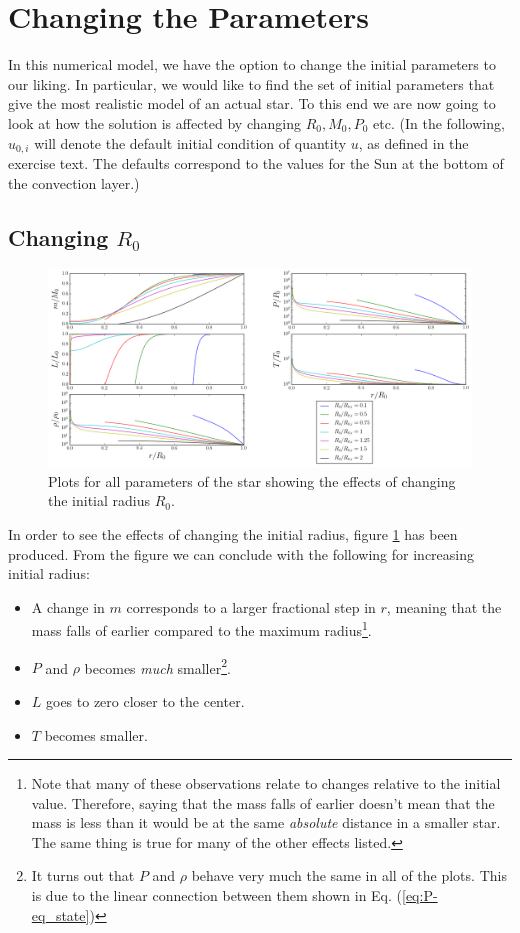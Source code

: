 \documentclass[11pt,twocolumn]{article}
\begin{document}
\section{Changing the Parameters}
\label{sec:changing-the-parameters}
In this numerical model, we have the option to change the initial
parameters to our liking. In particular, we would like to find the set
of initial parameters that give the most realistic model of an actual
star. To this end we are now going to look at how the solution is
affected by changing $R_0,M_0, P_0$ etc. (In the following, $u_{0,i}$
will denote the default initial condition of quantity $u$, as defined
in the exercise text. The defaults correspond to the values for the
Sun at the bottom of the convection layer.)

\subsection{Changing $R_0$}

\begin{figure}[ht]
  \centering
  \includegraphics[width=\linewidth]{fig/R_variation.png}
  \caption{\label{fig:R-variation} Plots for all parameters of the star
  showing the effects of changing the initial radius $R_0$.}
\end{figure}

In order to see the effects of changing the initial radius, figure
\ref{fig:R-variation} has been produced. From the figure we can
conclude with the following for increasing initial radius:

\begin{itemize}
  \item A change in $m$ corresponds to a larger fractional step in
    $r$, meaning that the mass falls of earlier compared to the
    maximum radius\footnote{Note that
      many of these observations relate to changes relative to the
      initial value. Therefore, saying that the mass falls of earlier
      doesn't mean that the mass is less than it would be at the same
      \emph{absolute} distance in a smaller star. The same thing is
      true for many of the other effects listed.}.
  \item $P$ and $\rho$ becomes \emph{much} smaller\footnote{It turns
      out that $P$ and $\rho$ behave very much the same in all of the
      plots. This is due to the linear connection between them shown
      in Eq. (\ref{eq:P-eq_state})}. 
  \item $L$ goes to zero closer to the center.
  \item $T$ becomes smaller.
\end{itemize}
\end{document}
